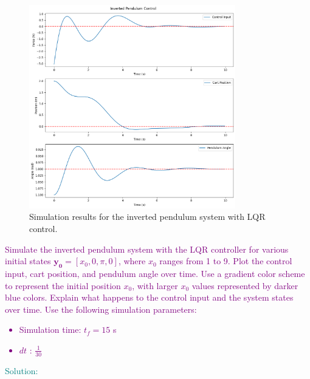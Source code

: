 \documentclass[a4 paper]{article}
\begin{document}
\begin{figure}[H]
    \centering
    \includegraphics[width=0.8\textwidth]{./figs/figs.png}
    \caption{Simulation results for the inverted pendulum system with LQR control.}
\end{figure}

\bigbreak

\newpage
\textcolor{purple}{
 Simulate the inverted pendulum system with the LQR controller for various initial states 
\(\mathbf{y_0} = [x_0, 0, \pi, 0]\), where \(x_0\) ranges from 1 to 9. Plot the control input, 
cart position, and pendulum angle over time. Use a gradient color scheme to represent the initial position \(x_0\), 
with larger \(x_0\) values represented by darker blue colors. Explain what happens to the control input and the system states over time.
Use the following simulation parameters:
\begin{itemize}
    \item Simulation time: \( t_f = 15 \) s
    \item $dt$ : \( \frac{1}{30} \)
\end{itemize}
}

\medbreak

\textcolor{teal}{
    Solution:
}
\end{document}
